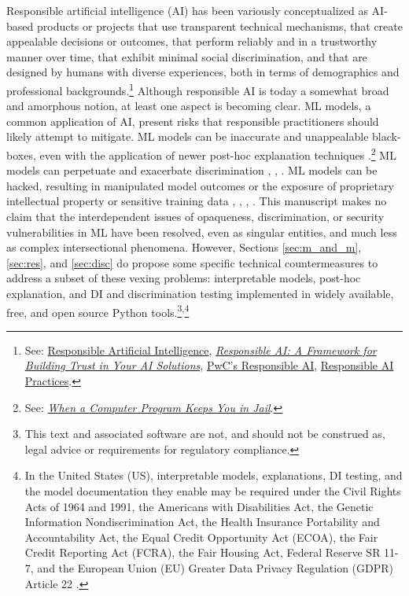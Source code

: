 \documentclass[information,article,submit,moreauthors,pdftex]{definitions/mdpi}
\begin{document}
Responsible artificial intelligence (AI) has been variously conceptualized as AI-based products or projects that use transparent technical mechanisms, that create appealable decisions or outcomes, that perform reliably and in a trustworthy manner over time, that exhibit minimal social discrimination, and that are designed by humans with diverse experiences, both in terms of demographics and professional backgrounds.\footnote{See: \href{https://ec.europa.eu/jrc/communities/sites/jrccties/files/03_dignum_v.pdf}{Responsible Artificial Intelligence}, \href{https://www.accenture.com/_acnmedia/pdf-92/accenture-afs-responsible-ai.pdf}{\textit{Responsible AI: A Framework for Building Trust in Your AI Solutions}}, \href{https://www.pwc.com/us/en/services/consulting/analytics/artificial-intelligence/what-is-responsible-ai.html}{PwC's Responsible AI}, \href{https://ai.google/responsibilities/responsible-ai-practices/}{Responsible AI Practices}.} Although responsible AI is today a somewhat broad and amorphous notion, at least one aspect is becoming clear. ML models, a common application of AI, present risks that responsible practitioners should likely attempt to mitigate. ML models can be inaccurate and unappealable black-boxes, even with the application of newer post-hoc explanation techniques \cite{please_stop}.\footnote{See: \href{https://www.nytimes.com/2017/06/13/opinion/how-computers-are-harming-criminal-justice.html}{\textit{When a Computer Program Keeps You in Jail}}.} ML models can perpetuate and exacerbate discrimination \cite{feldman2015certifying}, \cite{dwork2012fairness}, \cite{gender_shades}.  ML models can be hacked, resulting in manipulated model outcomes or the exposure of proprietary intellectual property or sensitive training data \cite{security_of_ml}, \cite{model_stealing}, \cite{membership_inference}, \cite{shokri2019privacy}. This manuscript makes no claim that the interdependent issues of opaqueness, discrimination, or security vulnerabilities in ML have been resolved, even as singular entities, and much less as complex intersectional phenomena. However, Sections \ref{sec:m_and_m}, \ref{sec:res}, and \ref{sec:disc} do propose some specific technical countermeasures to address a subset of these vexing problems: interpretable models, post-hoc explanation, and DI and discrimination testing implemented in widely available, free, and open source Python tools.\footnote{This text and associated software are not, and should not be construed as, legal advice or requirements for regulatory compliance.}\textsuperscript{,}\footnote{In the United States (US), interpretable models, explanations, DI testing, and the model documentation they enable may be required under the Civil Rights Acts of 1964 and 1991, the Americans with Disabilities Act, the Genetic Information Nondiscrimination Act, the Health Insurance Portability and Accountability Act, the Equal Credit Opportunity Act (ECOA), the Fair Credit Reporting Act (FCRA), the Fair Housing Act, Federal Reserve SR 11-7, and the European Union (EU) Greater Data Privacy Regulation (GDPR) Article 22 \cite{ff_interpretability}.} 
\end{document}
